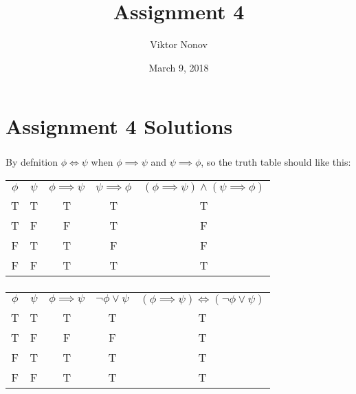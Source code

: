 \documentclass{article}
\title{Assignment 4}
\author{Viktor Nonov}
\date{March 9, 2018}
\begin{document}
\part{Assignment 4 Solutions}

\section{}
By defnition $\phi \Leftrightarrow \psi$ when $\phi \implies \psi$ and $\psi \implies \phi$, so the truth table should like this:\\
\begin{tabular}{ c c c c c }
  $\phi$ & $\psi$ & $\phi \implies \psi$ & $\psi \implies \phi$ & $(\phi \implies \psi) \wedge (\psi \implies \phi)$ \\
  T      & T      & T                    & T                    & T                                                  \\
  T      & F      & F                    & T                    & F                                                  \\
  F      & T      & T                    & F                    & F                                                  \\
  F      & F      & T                    & T                    & T                                                  \\
\end{tabular}

\section{}
\begin{tabular}{ c c c c c }
  $\phi$ & $\psi$ & $\phi \implies \psi$ & $\neg \phi \vee \psi$ & $(\phi \implies \psi) \Leftrightarrow (\neg \phi \vee \psi)$ \\
  T      & T      & T                    & T                    & T                                                  \\
  T      & F      & F                    & F                    & T                                                 \\
  F      & T      & T                    & T                    & T                                                 \\
  F      & F      & T                    & T                    & T                                                  \\
\end{tabular} \\
\end{document}
